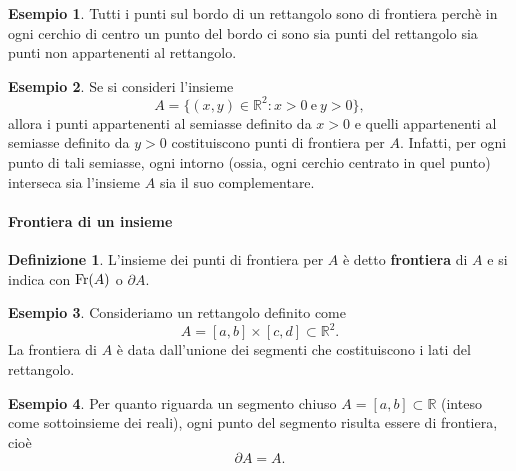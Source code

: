 \documentclass{article}
\theoremstyle{plain}
\theoremstyle{definition}
\newtheorem{defn}{Definizione}[section]
\newtheorem{exmp}{Esempio}[section]
\theoremstyle{remark}
\begin{document}
\vspace{10pt}

\begin{exmp}
    Tutti i punti sul bordo di un rettangolo sono di frontiera perchè in ogni cerchio di centro un punto del bordo ci sono sia punti del rettangolo sia punti non appartenenti al rettangolo.
\end{exmp}

\vspace{10pt}

\begin{exmp}
    Se si consideri l'insieme 
    \[ A=\{(x,y)\in\mathbb{R}^2 : x>0 \ \text{e} \ y>0\}, \]
    allora i punti appartenenti al semiasse definito da \(x>0\) e quelli appartenenti al semiasse definito da \(y>0\) costituiscono punti di frontiera per \(A\). 
    Infatti, per ogni punto di tali semiasse, ogni intorno (ossia, ogni cerchio centrato in quel punto) interseca sia l'insieme \(A\) sia il suo complementare.
\end{exmp}

\vspace{10pt}

\paragraph{Frontiera di un insieme}
\begin{bxthm}
\begin{defn}
    L'insieme dei punti di frontiera per $A$ è detto \textbf{frontiera} di $A$ e si indica con $\textup{Fr}(A)$ o $\partial A$.
\end{defn}
\end{bxthm}

\vspace{10pt}

\begin{exmp}
    Consideriamo un rettangolo definito come
    \[
    A = [a,b] \times [c,d] \subset \mathbb{R}^2.
    \]
    La frontiera di \( A \) è data dall'unione dei segmenti che costituiscono i lati del rettangolo.
\end{exmp}

\vspace{10pt}

\begin{exmp}
    Per quanto riguarda un segmento chiuso \( A = [a,b] \subset \mathbb{R} \) (inteso come sottoinsieme dei reali), ogni punto del segmento risulta essere di frontiera, cioè
    \[
    \partial A = A.
    \]
\end{exmp}
\end{document}
